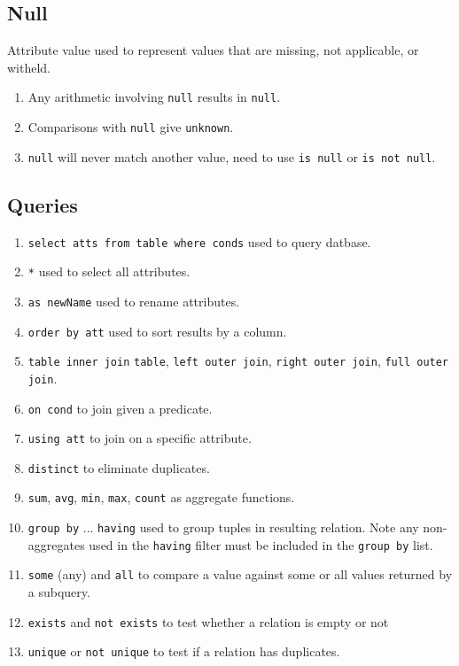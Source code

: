 \documentclass[twocolumn,english]{article}
\begin{document}
\subsection{Null}

Attribute value used to represent values that are missing, not applicable,
or witheld. 
\begin{enumerate}
\item Any arithmetic involving \texttt{null} results in \texttt{null}. 
\item Comparisons with \texttt{null} give \texttt{unknown}. 
\item \texttt{null} will never match another value, need to use \texttt{is
null} or \texttt{is not null}. 
\end{enumerate}

\subsection{Queries}
\begin{enumerate}
\item \texttt{select atts from table where conds} used to query datbase. 
\item \texttt{{*}} used to select all attributes. 
\item \texttt{as newName} used to rename attributes. 
\item \texttt{order by att} used to sort results by a column. 
\item \texttt{table inner join} \texttt{table}, \texttt{left outer join},
\texttt{right outer join}, \texttt{full outer join}. 
\item \texttt{on cond} to join given a predicate. 
\item \texttt{using att} to join on a specific attribute. 
\item \texttt{distinct} to eliminate duplicates. 
\item \texttt{sum}, \texttt{avg}, \texttt{min}, \texttt{max}, \texttt{count}
as aggregate functions. 
\item \texttt{group by} ... \texttt{having} used to group tuples in resulting
relation. Note any non-aggregates used in the \texttt{having} filter
must be included in the \texttt{group by} list.
\item \texttt{some} (any) and \texttt{all} to compare a value against some
or all values returned by a subquery. 
\item \texttt{exists} and \texttt{not exists} to test whether a relation
is empty or not 
\item \texttt{unique} or \texttt{not unique} to test if a relation has duplicates.
\end{enumerate}
\end{document}
